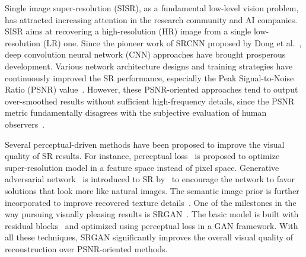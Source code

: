 \documentclass[runningheads]{llncs}
\begin{document}
Single image super-resolution (SISR), as a fundamental low-level vision problem, has attracted increasing attention in 
the research community and AI companies.
%
SISR aims at recovering a high-resolution (HR) image from a single low-resolution (LR) one.
Since the pioneer work of SRCNN proposed by Dong et al.~\cite{dong2014learning}, deep convolution neural network 
(CNN) approaches have brought prosperous development.
%
Various network architecture designs and training strategies have continuously improved the SR performance, especially 
the Peak Signal-to-Noise Ratio (PSNR) 
value~\cite{kim2016accurate,lai2017deep,kim2016deeply,ledig2017photo,tai2017image,tai2017memnet,haris2018deep,zhang2018residual,zhang2018image}.
%
However, these PSNR-oriented approaches tend to output over-smoothed results without sufficient high-frequency details, 
since the PSNR metric fundamentally disagrees with the subjective evaluation of human observers~\cite{ledig2017photo}.

Several perceptual-driven methods have been proposed to improve the visual quality of SR results.
%
For instance, perceptual loss~\cite{johnson2016perceptual,bruna2015super} is proposed to optimize super-resolution 
model in a feature space instead of pixel space. 
%
Generative adversarial network~\cite{goodfellow2014generative} is introduced to SR 
by~\cite{ledig2017photo,sajjadi2017enhancenet} to encourage the network to favor solutions that look more like natural 
images.
%
The semantic image prior is further incorporated to improve recovered texture details~\cite{wang2018sftgan}.
One of the milestones in the way pursuing visually pleasing results is SRGAN~\cite{ledig2017photo}.
%
The basic model is built with residual blocks~\cite{he2016deep} and optimized using perceptual loss in a GAN framework.
%
With all these techniques, SRGAN significantly improves the overall visual quality of reconstruction over PSNR-oriented 
methods.

\end{document}
